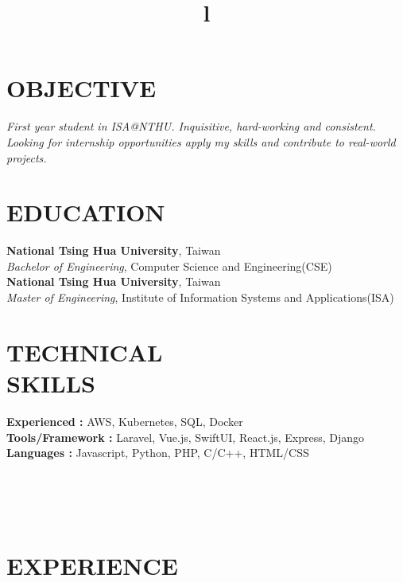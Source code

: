 \documentclass[margin]{res}
\begin{document}
\begin{resume}
\section{OBJECTIVE}
{\sl First year student in ISA@NTHU. Inquisitive, hard-working and consistent. Looking for internship opportunities apply my skills and contribute to real-world projects. }

\section{EDUCATION}
\textbf{National Tsing Hua University}, Taiwan\\
{\sl Bachelor of Engineering}, Computer Science and Engineering(CSE)\\
\textbf{National Tsing Hua University}, Taiwan \\
{\sl Master of Engineering}, Institute of Information Systems and Applications(ISA) 
\section{TECHNICAL\\SKILLS}

\textbf{Experienced : } AWS, Kubernetes, SQL, Docker
\\
\textbf{Tools/Framework : } Laravel, Vue.js, SwiftUI, React.js, Express, Django
\\
\textbf{Languages : } Javascript, Python, PHP, C/C++, HTML/CSS

\begin{format}
\title{l}\\
\\
\body\\
\end{format}

\section{EXPERIENCE}


\end{resume}
\end{document}
